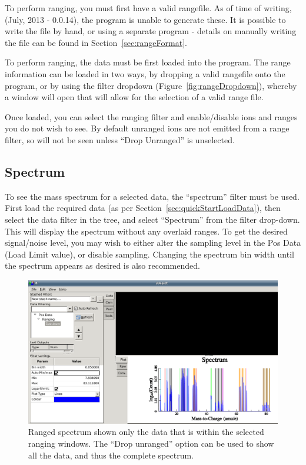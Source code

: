 \documentclass[10pt]{article}
\begin{document}
To perform ranging, you must first have a valid rangefile. As of time of writing, (July, 2013 - 0.0.14), the program is unable to generate these. It is possible to write the file by hand, or using a separate program - details on manually writing the file can be found in Section~\ref{sec:rangeFormat}.

To perform ranging, the data must be first loaded into the program. The range information can be loaded in two ways, by dropping a valid rangefile onto the program, or by using the filter dropdown (Figure~\ref{fig:rangeDropdown}), whereby a window will open that will allow for the selection of a valid range file. 

Once loaded, you can select the ranging filter and enable/disable ions and ranges you do not wish to see. By default unranged ions are not emitted from a range filter, so will not be seen unless ``Drop Unranged'' is unselected.


\subsection{Spectrum}
To see the mass spectrum for a selected data, the ``spectrum'' filter must be used. First load the required data (as per Section~\ref{sec:quickStartLoadData}), then select the data filter in the tree, and select ``Spectrum'' from the filter drop-down. This will display the spectrum without any overlaid ranges. To get the desired signal/noise level, you may wish to either alter the sampling level in the Pos Data (Load Limit value), or disable sampling. Changing the spectrum bin width until the spectrum appears as desired is also recommended.

\begin{figure}[h]
\centering
 \includegraphics[width=0.85 \textwidth,keepaspectratio=true]{./figures/rangedSpectrum.png}

 \caption{Ranged spectrum shown only the data that is within the selected ranging windows. The ``Drop unranged'' option can be used to show all the data, and thus the complete spectrum.}
\label{fig:rangedSpectrum}
\end{figure}
\end{document}
